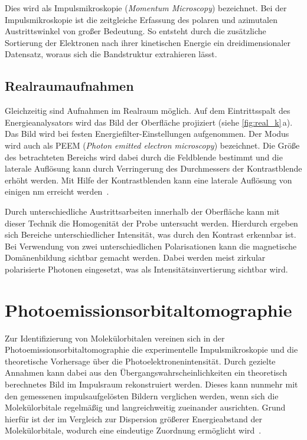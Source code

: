             Dies wird als Impulsmikroskopie (\textit{Momentum Microscopy}) bezeichnet.
            Bei der Impulsmikroskopie ist die zeitgleiche Erfassung des polaren und azimutalen Austrittswinkel von großer Bedeutung. 
            So entsteht durch die zusätzliche Sortierung der Elektronen nach ihrer kinetischen Energie ein dreidimensionaler Datensatz, woraus sich die Bandstruktur extrahieren lässt.

        \subsection{Realraumaufnahmen}
            Gleichzeitig sind Aufnahmen im Realraum möglich.
            Auf dem Eintrittsspalt des Energieanalysators wird das Bild der Oberfläche projiziert (siehe \autoref{fig:real_k}\,a).
            Das Bild wird bei festen Energiefilter-Einstellungen aufgenommen.
            Der Modus wird auch als PEEM (\textit{Photon emitted electron microscopy}) bezeichnet.
            Die Größe des betrachteten Bereichs wird dabei durch die Feldblende bestimmt und die laterale Auflösung kann durch Verringerung des Durchmessers der Kontrastblende erhöht werden.
            Mit Hilfe der Kontrastblenden kann eine laterale Auflösung von einigen \si{\nano\meter} erreicht werden~\cite{locatelli_chemical_2015}. 

            Durch unterschiedliche Austrittsarbeiten innerhalb der Oberfläche kann mit dieser Technik die Homogenität der Probe untersucht werden.
            Hierdurch ergeben sich Bereiche unterschiedlicher Intensität, was durch den Kontrast erkennbar ist.
            Bei Verwendung von zwei unterschiedlichen Polarisationen kann die magnetische Domänenbildung sichtbar gemacht werden.
            Dabei werden meist zirkular polarisierte Photonen eingesetzt, was als Intensitätsinvertierung sichtbar wird.
        
    \section{Photoemissionsorbitaltomographie} \label{sec:MOT}
        Zur Identifizierung von Molekülorbitalen vereinen sich in der Photoemissionsorbitaltomographie die experimentelle Impulsmikroskopie und die theoretische Vorhersage über die Photoelektronenintensität.
        Durch gezielte Annahmen kann dabei aus den Übergangswahrscheinlichkeiten ein theoretisch berechnetes Bild im Impulsraum rekonstruiert werden.
        Dieses kann nunmehr mit den gemessenen impulsaufgelösten Bildern verglichen werden, wenn sich die Molekülorbitale regelmäßig und langreichweitig zueinander ausrichten.
        Grund hierfür ist der im Vergleich zur Dispersion größerer Energieabstand der Molekülorbitale, wodurch eine eindeutige Zuordnung ermöglicht wird~\cite{puschnig_reconstruction_2009}.

